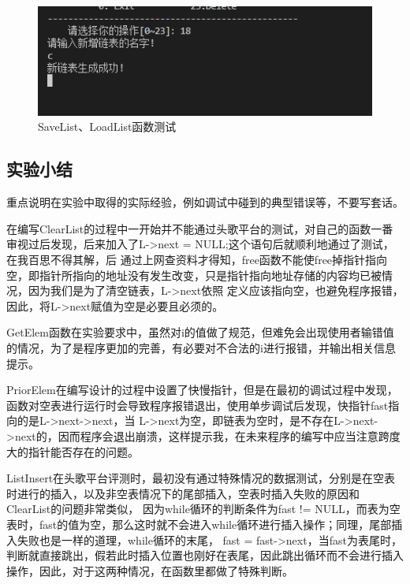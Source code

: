 \documentclass[supercite]{Experimental_Report}
\theoremstyle{definition}
\begin{document}
\begin{itemize}
\begin{figure}[htbp]
\begin{minipage}{0.9\linewidth}
			      \centering
			      \includegraphics[width=0.9\linewidth]{images/test-55.png}
		      \end{minipage}
		      \caption{SaveList、LoadList函数测试}
		      \label{fig1-20}
	      \end{figure}
\end{itemize}

\subsection{实验小结}

重点说明在实验中取得的实际经验，例如调试中碰到的典型错误等，不要写套话。

在编写ClearList的过程中一开始并不能通过头歌平台的测试，对自己的函数一番审视过后发现，后来加入了L->next = NULL;这个语句后就顺利地通过了测试，在我百思不得其解，后
通过上网查资料才得知，free函数不能使free掉指针指向空，即指针所指向的地址没有发生改变，只是指针指向地址存储的内容均已被情况，因为我们是为了清空链表，L->next依照
定义应该指向空，也避免程序报错，因此，将L->next赋值为空是必要且必须的。

GetElem函数在实验要求中，虽然对i的值做了规范，但难免会出现使用者输错值的情况，为了是程序更加的完善，有必要对不合法的i进行报错，并输出相关信息提示。

PriorElem在编写设计的过程中设置了快慢指针，但是在最初的调试过程中发现，函数对空表进行运行时会导致程序报错退出，使用单步调试后发现，快指针fast指向的是L->next->next，当
L->next为空，即链表为空时，是不存在L->next->next的，因而程序会退出崩溃，这样提示我，在未来程序的编写中应当注意跨度大的指针能否存在的问题。

ListInsert在头歌平台评测时，最初没有通过特殊情况的数据测试，分别是在空表时进行的插入，以及非空表情况下的尾部插入，空表时插入失败的原因和ClearList的问题非常类似，
因为while循环的判断条件为fast != NULL，而表为空表时，fast的值为空，那么这时就不会进入while循环进行插入操作；同理，尾部插入失败也是一样的道理，while循环的末尾，
fast = fast->next，当fast为表尾时，判断就直接跳出，假若此时插入位置也刚好在表尾，因此跳出循环而不会进行插入操作，因此，对于这两种情况，在函数里都做了特殊判断。
\end{document}
